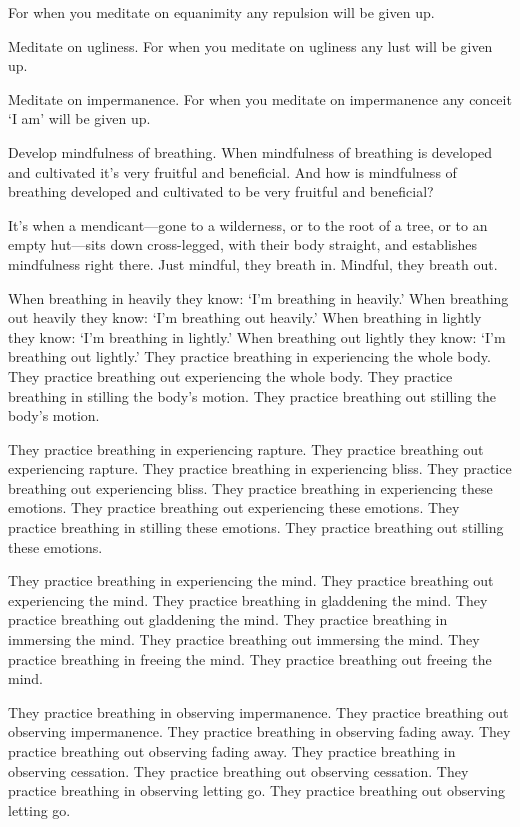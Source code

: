 \documentclass[12pt,openany]{book}%
\begin{document}
For when you meditate on equanimity any repulsion will be given up. 

Meditate on ugliness. For when you meditate on ugliness any lust will be given up. 

Meditate on impermanence. For when you meditate on impermanence any conceit ‘I am’ will be given up. 

Develop mindfulness of breathing. When mindfulness of breathing is developed and cultivated it’s very fruitful and beneficial. And how is mindfulness of breathing developed and cultivated to be very fruitful and beneficial? 

It’s when a mendicant—gone to a wilderness, or to the root of a tree, or to an empty hut—sits down cross-legged, with their body straight, and establishes mindfulness right there. Just mindful, they breath in. Mindful, they breath out. 

When breathing in heavily they know: ‘I’m breathing in heavily.’ When breathing out heavily they know: ‘I’m breathing out heavily.’ When breathing in lightly they know: ‘I’m breathing in lightly.’ When breathing out lightly they know: ‘I’m breathing out lightly.’ They practice breathing in experiencing the whole body. They practice breathing out experiencing the whole body. They practice breathing in stilling the body’s motion. They practice breathing out stilling the body’s motion. 

They practice breathing in experiencing rapture. They practice breathing out experiencing rapture. They practice breathing in experiencing bliss. They practice breathing out experiencing bliss. They practice breathing in experiencing these emotions. They practice breathing out experiencing these emotions. They practice breathing in stilling these emotions. They practice breathing out stilling these emotions. 

They practice breathing in experiencing the mind. They practice breathing out experiencing the mind. They practice breathing in gladdening the mind. They practice breathing out gladdening the mind. They practice breathing in immersing the mind. They practice breathing out immersing the mind. They practice breathing in freeing the mind. They practice breathing out freeing the mind. 

They practice breathing in observing impermanence. They practice breathing out observing impermanence. They practice breathing in observing fading away. They practice breathing out observing fading away. They practice breathing in observing cessation. They practice breathing out observing cessation. They practice breathing in observing letting go. They practice breathing out observing letting go. 
\end{document}
